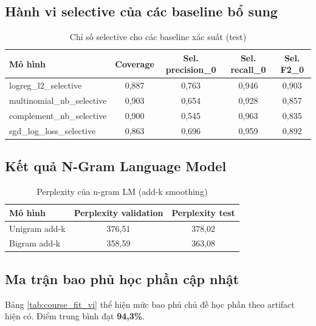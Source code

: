 ﻿\documentclass[12pt,a4paper]{article}
\begin{document}
\subsection{Hành vi selective của các baseline bổ sung}
\begin{table}[H]
\centering
\caption{Chỉ số selective cho các baseline xác suất (test)}
\label{tab:syllabus_selective_vi}
\begin{tabular}{lcccc}
\toprule
Mô hình & Coverage & Sel. precision\_0 & Sel. recall\_0 & Sel. F2\_0 \\
\midrule
logreg\_l2\_selective & 0,887 & 0,763 & 0,946 & 0,903 \\
multinomial\_nb\_selective & 0,903 & 0,654 & 0,928 & 0,857 \\
complement\_nb\_selective & 0,900 & 0,545 & 0,963 & 0,835 \\
sgd\_log\_loss\_selective & 0,863 & 0,696 & 0,959 & 0,892 \\
\bottomrule
\end{tabular}
\end{table}

\subsection{Kết quả N-Gram Language Model}
\begin{table}[H]
\centering
\caption{Perplexity của n-gram LM (add-k smoothing)}
\label{tab:ngram_ppl_vi}
\begin{tabular}{lcc}
\toprule
Mô hình & Perplexity validation & Perplexity test \\
\midrule
Unigram add-k & 376,51 & 378,02 \\
Bigram add-k & 358,59 & 363,08 \\
\bottomrule
\end{tabular}
\end{table}

\subsection{Ma trận bao phủ học phần cập nhật}
Bảng \ref{tab:course_fit_vi} thể hiện mức bao phủ chủ đề học phần theo artifact hiện có. Điểm trung bình đạt \textbf{94,3\%}.
\end{document}
